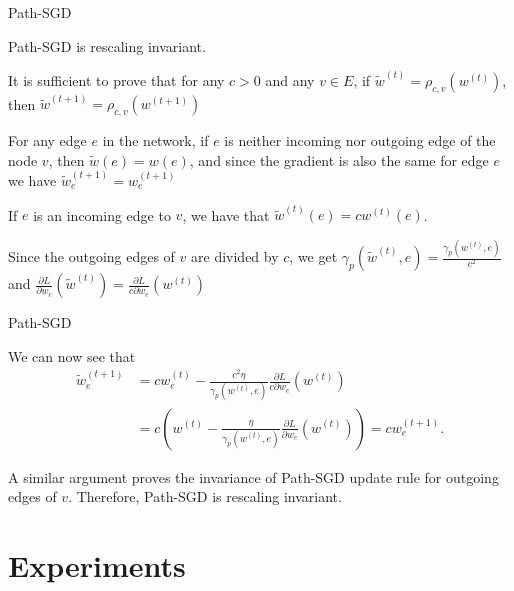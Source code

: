 \documentclass[presentation,xcolor={usenames,dvipsnames},10pt]{beamer}
\newcommand{\RSGD}{Path-SGD }
\begin{document}
\begin{frame}{\RSGD}
\begin{theorem}
	\RSGD is rescaling invariant.
\end{theorem}
\bit 
\item It is sufficient to prove that for any $c>0$ and any $v\in E$, if $\tilde{w}^{(t)} = \rho_{c,v}(w^{(t)})$, then $\tilde{w}^{(t+1)} = \rho_{c,v}(w^{(t+1)})$ 

\item For any edge $e$ in the network, if $e$ is neither incoming nor outgoing edge of the node $v$, then $\tilde{w}(e)=w(e)$, and since the gradient is also the same for edge $e$ we have $\tilde{w}^{(t+1)}_e=w^{(t+1)}_e$

\item If $e$ is an incoming edge to $v$, we have that $\tilde{w}^{(t)}(e)=cw^{(t)}(e)$.

\item Since the outgoing edges of $v$ are divided by $c$, we get $\gamma_p(\tilde{w}^{(t)},e) = \frac{\gamma_p(w^{(t)},e)}{c^2}$ and $\frac{\partial L}{\partial w_e}(\tilde{w}^{(t)})= \frac{\partial L}{c\partial w_e}(w^{(t)})$

\eit 
\end{frame} 

\begin{frame}{\RSGD}
\bit 
\item We can now see that
\begin{align*}
{\tilde{w}}^{(t+1)}_e &= cw^{(t)}_e - \frac{c^2\eta}{\gamma_p(w^{(t)},e)} \frac{\partial L}{c\partial w_e}(w^{(t)})\\
&= c\left(w^{(t)} - \frac{\eta}{\gamma_p(w^{(t)},e)} \frac{\partial L}{\partial w_e}(w^{(t)})\right) = cw^{(t+1)}_e.
\end{align*}

\item A similar argument proves the invariance of \RSGD update rule for outgoing edges of $v$. Therefore, \RSGD is rescaling invariant.
\eit 
\end{frame}

\section{Experiments}
\end{document}
